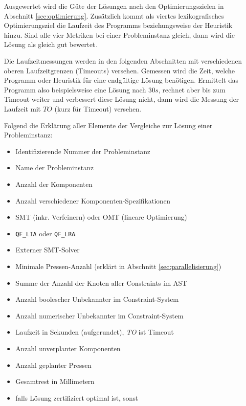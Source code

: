 Ausgewertet wird die Güte der Lösungen nach den Optimierungszielen in Abschnitt \ref{sec:optimierung}.
Zusätzlich kommt als viertes lexikografisches Optimierungsziel die Laufzeit des Programms beziehungsweise der Heuristik hinzu.
Sind alle vier Metriken bei einer Probleminstanz gleich, dann wird die Lösung als gleich gut bewertet.

Die Laufzeitmessungen werden in den folgenden Abschnitten mit verschiedenen oberen Laufzeitgrenzen (Timeouts) versehen.
Gemessen wird die Zeit, welche Programm oder Heuristik für eine endgültige Lösung benötigen.
Ermittelt das Programm also beispielsweise eine Lösung nach $30s$, rechnet aber bis zum Timeout weiter und verbessert diese Lösung nicht,
dann wird die Messung der Laufzeit mit $TO$ (kurz für Timeout) versehen.

Folgend die Erklärung aller Elemente der Vergleiche zur Lösung einer Probleminstanz:
\begin{itemize}
    \item {} Identifizierende Nummer der Probleminstanz
    \item {} Name der Probleminstanz
    \item {} Anzahl der Komponenten
    \item {} Anzahl verschiedener Komponenten-Spezifikationen
    \item {} SMT (inkr. Verfeinern) oder OMT (lineare Optimierung)
    \item {} \texttt{QF\_LIA} oder \texttt{QF\_LRA}
    \item {} Externer SMT-Solver
    \item {} Minimale Pressen-Anzahl (erklärt in Abschnitt \ref{sec:parallelisierung})
    \item {} Summe der Anzahl der Knoten aller Constraints im AST
    \item {} Anzahl boolescher Unbekannter im Constraint-System
    \item {} Anzahl numerischer Unbekannter im Constraint-System
    \item {} Laufzeit in Sekunden (aufgerundet), \textit{TO} ist Timeout
    \item {} Anzahl unverplanter Komponenten
    \item {} Anzahl geplanter Pressen
    \item {} Gesamtrest in Millimetern
    \item {} \cmark \; falls Lösung zertifiziert optimal ist, \xmark \; sonst
\end{itemize}

